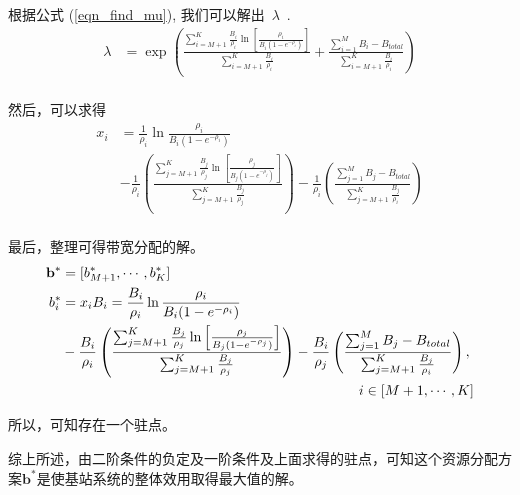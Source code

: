 根据公式 (\ref{eqn_find_mu}), 我们可以解出~$\lambda$~.
\begin{equation*}
\begin{split}
\lambda &= \exp \left( \frac{\sum_{i=M+1}^K \frac{B_i}{\rho_i} \ln \left[ \frac{\rho_i}{B_i(1-e^{-\rho_i})} \right]
}{\sum_{i=M+1}^K \frac{B_i}{\rho_i}} \right.
+ \left. \frac{ 
\sum_{i=1}^M B_i - B_{total}}{\sum_{i=M+1}^K \frac{B_i}{\rho_i}} \right)\\
\end{split}
\end{equation*}

然后，可以求得
%
\begin{equation}
\begin{split}
x_i & = \frac{1}{\rho_i} \ln \frac{\rho_i}{B_i(1-e^{-\rho_i})} \\
&-\frac{1}{\rho_i}\left( \frac{\sum_{j=M+1}^K \frac{B_j}{\rho_j} \ln \left[\frac{\rho_j}{B_j(1-e^{-\rho_j})}\right] 
}{\sum_{j=M+1}^K \frac{B_j}{\rho_j}} \right)
-\frac{1}{\rho_i}\left( \frac{ 
\sum_{j=1}^M B_j - B_{total}}{\sum_{j=M+1}^K \frac{B_j}{\rho_i}} \right) \\
\end{split}
\end{equation}
%

最后，整理可得带宽分配的解。
%
\begin{equation}
\begin{split}
\mathbf{b^*}& = [b^*_{M+1}, \cdots, b^*_{K}]\\
b_i^* & = x_iB_i = \frac{B_i}{\rho_i} \ln \frac{\rho_i}{B_i(1-e^{-\rho_i})} \\
&-\frac{B_i}{\rho_i}\left( \frac{\sum_{j=M+1}^K \frac{B_j}{\rho_j} \ln \left[\frac{\rho_j}{B_j(1-e^{-\rho_j})}\right] 
}{\sum_{j=M+1}^K \frac{B_j}{\rho_j}} \right)
 -\frac{B_i}{\rho_j}\left( \frac{ 
\sum_{j=1}^M B_j - B_{total}}{\sum_{j=M+1}^K \frac{B_j}{\rho_i}} \right),  \\ 
 & \hspace{75mm} i \in [M+1, \cdots, K] \\
\end{split}
\label{eqn:chap_cacop:b_i_bw}
\end{equation}

所以，可知存在一个驻点。

综上所述，由二阶条件的负定及一阶条件及上面求得的驻点，可知这个资源分配方案$\mathbf{b^*}$是使基站系统的整体效用取得最大值的解。
%
